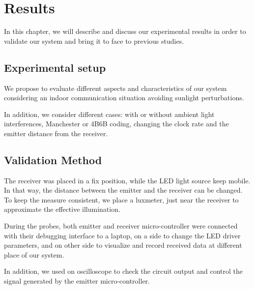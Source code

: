 
\chapter{Results} %

\label{Results} %


In this chapter, we will describe and discuss our experimental results in order to validate our system and bring it to face to previous studies.
 

\section{Experimental setup}

We propose to evaluate different aspects and characteristics of our system considering an indoor communication situation avoiding sunlight perturbations.

In addition, we consider different cases: with or without ambient light interferences, Manchester or 4B6B coding, changing the clock rate and the emitter distance from the receiver. 

\section{Validation Method}

The receiver was placed in a fix position, while the LED light source keep mobile. In that way, the distance between the emitter and the receiver can  be changed. To keep the measure consistent, we place a luxmeter, just near the receiver to approximate the effective illumination.

During the probes, both emitter and receiver micro-controller were connected with their debugging interface to a laptop, on a side to change the LED driver parameters, and on other side to visualize and record received data at different place of our system. 

In addition, we used on oscilloscope to check the circuit output and control the signal generated by the emitter micro-controller.

